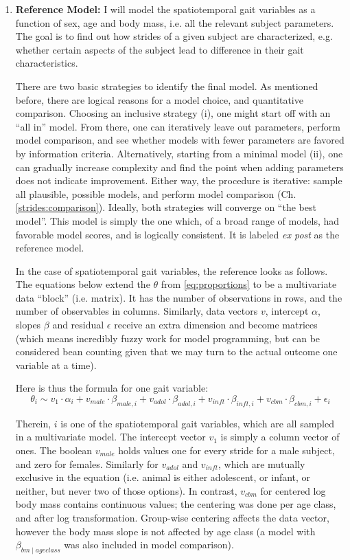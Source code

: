 \begin{enumerate}
\item \textbf{Reference Model:}
\label{sec:orge7f3220}
I will model the spatiotemporal gait variables as a function of sex, age and body mass, i.e. all the relevant subject parameters.
The goal is to find out how strides of a given subject are characterized, e.g. whether certain aspects of the subject lead to difference in their gait characteristics.

There are two basic strategies to identify the final model.
As mentioned before, there are logical reasons for a model choice, and quantitative comparison.
Choosing an inclusive strategy (i), one might start off with an ``all in'' model.
From there, one can iteratively leave out parameters, perform model comparison, and see whether models with fewer parameters are favored by information criteria.
Alternatively, starting from a minimal model (ii), one can gradually increase complexity and find the point when adding parameters does not indicate improvement.
Either way, the procedure is iterative: sample all plausible, possible models, and perform model comparison (Ch. \ref{strides:comparison}).
Ideally, both strategies will converge on ``the best model''.
This model is simply the one which, of a broad range of models, had favorable model scores, and is logically consistent.
It is labeled \emph{ex post} as the reference model.


In the case of spatiotemporal gait variables, the reference looks as follows.
The equations below extend the \(\theta\) from \eqref{eq:proportions} to be a multivariate data ``block'' (i.e. matrix).
It has the number of observations in rows, and the number of observables in columns.
Similarly, data vectors \(v\), intercept \(\alpha\), slopes \(\beta\) and residual \(\epsilon\) receive an extra dimension and become matrices (which means incredibly fuzzy work for model programming, but can be considered bean counting given that we may turn to the actual outcome one variable at a time).

Here is thus the formula for one gait variable:
\begin{equation} \theta_{i} \sim v_{1}\cdot\alpha_{i} + v_{male}\cdot\beta_{male,i} + v_{adol}\cdot\beta_{adol,i} + v_{inft}\cdot\beta_{inft,i} + v_{cbm}\cdot\beta_{cbm,i} + \epsilon_{i} \label{eq:stride} \end{equation}

Therein, \(i\) is one of the spatiotemporal gait variables, which are all sampled in a multivariate model.
The intercept vector \(v_{1}\) is simply a column vector of ones.
The boolean \(v_{male}\) holds values one for every stride for a male subject, and zero for females.
Similarly for \(v_{adol}\) and \(v_{inft}\), which are mutually exclusive in the equation (i.e. animal is either adolescent, or infant, or neither, but never two of those options).
In contrast, \(v_{cbm}\) for centered log body mass contains continuous values; the centering was done per age class, and after log transformation.
Group-wise centering affects the data vector, however the body mass slope is not affected by age class (a model with \(\beta_{bm\mid ageclass}\) was also included in model comparison).



\end{enumerate}
